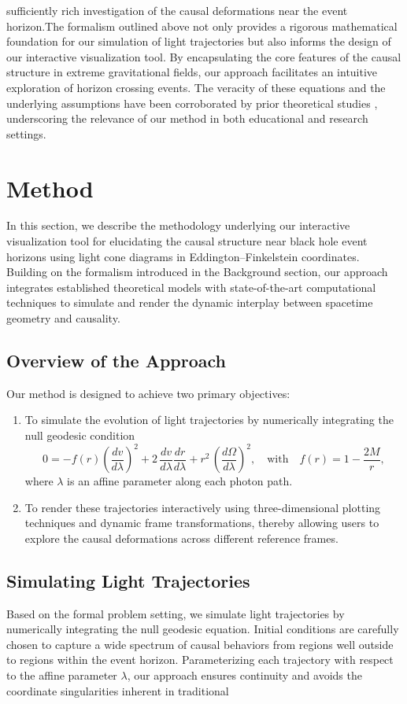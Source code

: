 \documentclass{article}
\begin{document}
sufficiently rich investigation of the causal deformations near the event horizon.The formalism outlined above not only provides a rigorous mathematical foundation for our simulation of light trajectories but also informs the design of our interactive visualization tool. By encapsulating the core features of the causal structure in extreme gravitational fields, our approach facilitates an intuitive exploration of horizon crossing events. The veracity of these equations and the underlying assumptions have been corroborated by prior theoretical studies \cite{ref2}, underscoring the relevance of our method in both educational and research settings.

\section{Method}In this section, we describe the methodology underlying our interactive visualization tool for elucidating the causal structure near black hole event horizons using light cone diagrams in Eddington--Finkelstein coordinates. Building on the formalism introduced in the Background section, our approach integrates established theoretical models with state-of-the-art computational techniques to simulate and render the dynamic interplay between spacetime geometry and causality.\subsection{Overview of the Approach}Our method is designed to achieve two primary objectives:\begin{enumerate}  \item To simulate the evolution of light trajectories by numerically integrating the null geodesic condition  \begin{equation}  0 = -f(r)\left(\frac{dv}{d\lambda}\right)^2 + 2\,\frac{dv}{d\lambda}\frac{dr}{d\lambda} + r^2\,\left(\frac{d\Omega}{d\lambda}\right)^2, \quad \text{with} \quad f(r)=1-\frac{2M}{r},  \end{equation}  where $\lambda$ is an affine parameter along each photon path.  \item To render these trajectories interactively using three-dimensional plotting techniques and dynamic frame transformations, thereby allowing users to explore the causal deformations across different reference frames.\end{enumerate}\subsection{Simulating Light Trajectories}Based on the formal problem setting, we simulate light trajectories by numerically integrating the null geodesic equation. Initial conditions are carefully chosen to capture a wide spectrum of causal behaviors from regions well outside to regions within the event horizon. Parameterizing each trajectory with respect to the affine parameter $\lambda$, our approach ensures continuity and avoids the coordinate singularities inherent in traditional 
\end{document}
